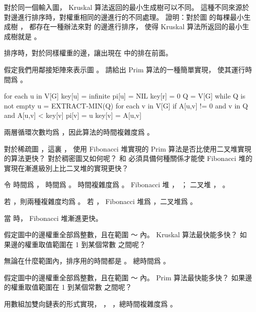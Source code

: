 \startsection[
  title={The algorithms of Kruskal and Prim},
]

\startEXERCISE
對於同一個輸入圖， Kruskal 算法返回的最小生成樹可以不同。
這種不同來源於對邊進行排序時，對權重相同的邊進行的不同處理。
證明：對於圖  的每棵最小生成樹 ，
都存在一種辦法來對  的邊進行排序，
使得 Kruskal 算法所返回的最小生成樹就是 。
\stopEXERCISE

\startANSWER
排序時，對於同樣權重的邊，讓出現在  中的排在前面。
\stopANSWER

\startEXERCISE
假定我們用鄰接矩陣來表示圖 。
請給出 Prim 算法的一種簡單實現，
使其運行時間爲 。
\stopEXERCISE

\startANSWER
{}
\startCLRS
for each u in V[G]
	key[u] = infinite
	pi[u] = NIL
key[r] = 0
Q = V[G]
while Q is not empty
	u = EXTRACT-MIN(Q)
	for each v in V[G]
		if A[u,v] != 0 and v in Q and A[u,v] < key[v]
			pi[v] = u
			key[v] = A[u,v]
\stopCLRS

兩層循環次數均爲 ，因此算法的時間複雜度爲 。
\stopANSWER

\startEXERCISE
對於稀疏圖 ，這裏 ，
使用 Fibonacci 堆實現的 Prim 算法是否比使用二叉堆實現的算法更快？
對於稠密圖又如何呢？
  和  必須具備何種關係才能使 Fibonacci 堆的實現在漸進級別上比二叉堆的實現更快？
\stopEXERCISE

\startANSWER
令  時間爲 ，  時間爲 。
時間複雜度爲 。
 Fibonacci 堆 ， ；
二叉堆 ， 。

若 ，則兩種複雜度均爲 。
若 ， Fibonacci 堆爲 ，二叉堆爲 。

當  時， Fibonacci 堆漸進更快。
\stopANSWER

\startEXERCISE
假定圖中的邊權重全部爲整數，且在範圍 ～ 內。
 Kruskal 算法最快能多快？
如果邊的權重取值範圍在 1 到某個常數  之間呢？
\stopEXERCISE

\startANSWER
無論在什麼範圍內，排序用的時間都是 。
總時間爲 。
\stopANSWER

\startEXERCISE
假定圖中的邊權重全部爲整數，且在範圍 ～ 內。
 Prim 算法最快能多快？
如果邊的權重取值範圍在 1 到某個常數  之間呢？
\stopEXERCISE

\startANSWER
用數組加雙向鏈表的形式實現， ， ，總時間複雜度爲 。
\stopANSWER

